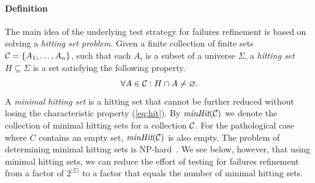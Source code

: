 \documentclass[3p,times]{elsarticle}
\newcommand{\minhits}{\text{\it minHit}}
\begin{document}
\paragraph{Definition} The main idea of the underlying test strategy for failures
refinement is based on solving a \emph{hitting set problem}. Given a finite
collection of finite sets ${\cal C} = \{ A_1,\dots,A_n\}$, such that each
$A_i$ is a subset of a universe $\Sigma$, a \emph{hitting set}
$H\subseteq\Sigma$ is a set satisfying the following property.
%
\begin{equation}
  \label{eq:hit}
  \forall A\in {\cal C}: H\cap A \neq\varnothing.
\end{equation}
%
A \emph{minimal hitting set} is a hitting set that cannot be further reduced
without losing the characteristic property (\ref{eq:hit}). By $\minhits({\cal
C})$ we denote the collection of minimal hitting sets for a collection ${\cal
C}$. For the pathological case where $C$ contains an empty set,
$\minhits({\cal C})$ is also empty. The problem of determining minimal hitting sets is %
NP-hard~\cite{5533149}. We see below, however, that using minimal hitting
sets, we can reduce the effort of testing for failures refinement from a
factor of $2^{|\Sigma|}$ to a factor that equals the number of minimal
hitting sets.

\end{document}
